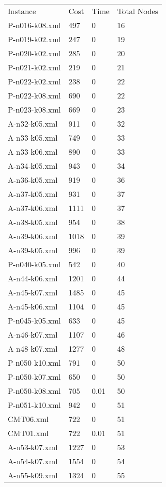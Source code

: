 \documentclass[12pt]{article}
\begin{document}
\begin{appendices}
\begin{table}[]
	\begin{tabular}{llll}
	Instance & Cost & Time & Total Nodes \\
	P-n016-k08.xml & 497 & 0 & 16 \\
	P-n019-k02.xml & 247 & 0 & 19 \\
	P-n020-k02.xml & 285 & 0 & 20 \\
	P-n021-k02.xml & 219 & 0 & 21 \\
	P-n022-k02.xml & 238 & 0 & 22 \\
	P-n022-k08.xml & 690 & 0 & 22 \\
	P-n023-k08.xml & 669 & 0 & 23 \\
	A-n32-k05.xml & 911 & 0 & 32 \\
	A-n33-k05.xml & 749 & 0 & 33 \\
	A-n33-k06.xml & 890 & 0 & 33 \\
	A-n34-k05.xml & 943 & 0 & 34 \\
	A-n36-k05.xml & 919 & 0 & 36 \\
	A-n37-k05.xml & 931 & 0 & 37 \\
	A-n37-k06.xml & 1111 & 0 & 37 \\
	A-n38-k05.xml & 954 & 0 & 38 \\
	A-n39-k06.xml & 1018 & 0 & 39 \\
	A-n39-k05.xml & 996 & 0 & 39 \\
	P-n040-k05.xml & 542 & 0 & 40 \\
	A-n44-k06.xml & 1201 & 0 & 44 \\
	A-n45-k07.xml & 1485 & 0 & 45 \\
	A-n45-k06.xml & 1104 & 0 & 45 \\
	P-n045-k05.xml & 633 & 0 & 45 \\
	A-n46-k07.xml & 1107 & 0 & 46 \\
	A-n48-k07.xml & 1277 & 0 & 48 \\
	P-n050-k10.xml & 791 & 0 & 50 \\
	P-n050-k07.xml & 650 & 0 & 50 \\
	P-n050-k08.xml & 705 & 0.01 & 50 \\
	P-n051-k10.xml & 942 & 0 & 51 \\
	CMT06.xml & 722 & 0 & 51 \\
	CMT01.xml & 722 & 0.01 & 51 \\
	A-n53-k07.xml & 1227 & 0 & 53 \\
	A-n54-k07.xml & 1554 & 0 & 54 \\
	A-n55-k09.xml & 1324 & 0 & 55 \\

\end{tabular}
\end{table}
\end{appendices}
\end{document}
